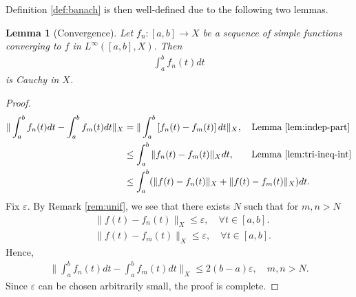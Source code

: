 \documentclass[12pt,reqno]{amsart}
\numberwithin{equation}{section}  %
\numberwithin{figure}{section}
\newcommand{\ee}{\varepsilon}
\theoremstyle{plain}
\newtheorem{lemma}{Lemma}
\theoremstyle{definition}
\theoremstyle{remark}
\begin{document}
%
%
%
%
%
%
%
%
%
Definition \ref{def:banach} is then well-defined due to the following two
lemmas.
%
%
%
%
%
%
%
%
%
%
\begin{lemma}[Convergence] Let $f_{n}: [a,b] \to X$ be a sequence of simple
  functions converging to $f$ in $L^{\infty}([a,b], X)$. Then
  \begin{equation*}
  \begin{split}
    \int_{a}^{b}f_{n}(t) dt
  \end{split}
  \end{equation*}
  is Cauchy in $X$. 
\label{lem:conv}
\end{lemma}
%
%
%
%
\begin{proof}
  \begin{equation}
    \begin{split}
  \| \int_{a}^{b} f_{n}(t) dt - \int_{a}^{b} f_{m}(t) dt \|_{X}
  & = \| \int_{a}^{b}\left[ f_{n}(t) - f_{m}(t) \right]dt \|_{X}, \quad \text{Lemma
  \ref{lem:indep-part}}
  \\
  & \le \int_{a}^{b} \| f_{n}(t) - f_{m}(t) \|_{X} dt,
  \quad \phantom{m} \text{Lemma \ref{lem:tri-ineq-int}}
  \\
  & \le \int_{a}^{b} (\| f(t) - f_{n}(t) \|_{X} + \| f(t) - f_{m}(t) \|_{X})dt.
\end{split}
\end{equation}
%
Fix $\ee$. By Remark \ref{rem:unif}, we see that there exists $N$ such
that for $m, n > N$
%
%
\begin{equation*}
\begin{split}
& \| f(t) - f_{n}(t) \|_{X} \le \ee, \quad \forall t \in [a, b].
\\
& \| f(t) - f_{m}(t) \|_{X} \le \ee, \quad \forall t \in [a, b].
\end{split}
\end{equation*}
Hence,
%
%
\begin{equation*}
\begin{split}
\| \int_{a}^{b} f_{n}(t) dt - \int_{a}^{b} f_{m}(t) dt \|_{X} \le 2(b-a) \ee,
\quad m,n > N.
\end{split}
\end{equation*}
%
Since $\ee$ can be chosen arbitrarily small, the proof is complete.
\end{proof}
\end{document}
